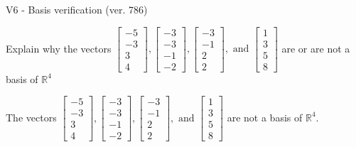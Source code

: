 \begin{exercise}
  \begin{exerciseTitle}V6 - Basis verification (ver. 786)\end{exerciseTitle}
  \begin{exerciseStatement}
    Explain why the vectors \(\left[\begin{array}{r}
-5 \\
-3 \\
3 \\
4
\end{array}\right] , \left[\begin{array}{r}
-3 \\
-3 \\
-1 \\
-2
\end{array}\right] , \left[\begin{array}{r}
-3 \\
-1 \\
2 \\
2
\end{array}\right] , \text{ and } \left[\begin{array}{r}
1 \\
3 \\
5 \\
8
\end{array}\right]\) are or are not a basis of \(\mathbb{R}^4\)	


  \end{exerciseStatement}
  \begin{exerciseAnswer}
   The vectors \(\left[\begin{array}{r}
-5 \\
-3 \\
3 \\
4
\end{array}\right] , \left[\begin{array}{r}
-3 \\
-3 \\
-1 \\
-2
\end{array}\right] , \left[\begin{array}{r}
-3 \\
-1 \\
2 \\
2
\end{array}\right] , \text{ and } \left[\begin{array}{r}
1 \\
3 \\
5 \\
8
\end{array}\right]\) 
  	 are not  a basis of \(\mathbb{R}^4\).
  


  \end{exerciseAnswer}
\end{exercise}